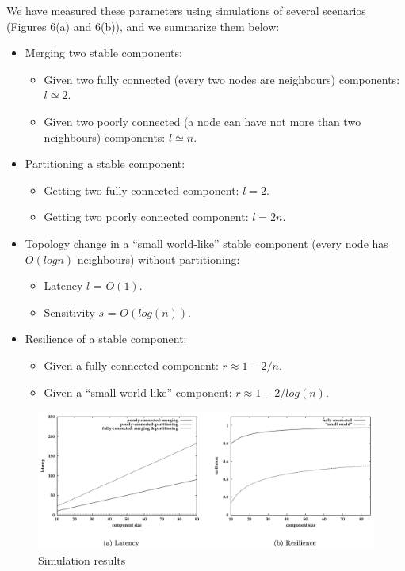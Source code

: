 We have measured these parameters using simulations of several scenarios (Figures 6(a) and 6(b)), and we summarize them below:

\begin{itemize}
	\item Merging two stable components:
	
	\begin{itemize}
		\item Given two fully connected (every two nodes are neighbours) components: $l \simeq 2$.
		\item Given two poorly connected (a node can have not more than two neighbours) components: $l \simeq n$.
	\end{itemize}
	
	\item Partitioning a stable component:
	
	\begin{itemize}
		\item Getting two fully connected component: $l = 2$.
		\item Getting two poorly connected component: $l = 2n$.
	\end{itemize}
	
	\item Topology change in a “small world-like” stable component (every node has $O(log n)$ neighbours) without partitioning:
	\begin{itemize}
		\item Latency $l$ = $O(1)$.
		\item Sensitivity $s$ = $O(log(n))$.
	\end{itemize}
	
	\item Resilience of a stable component:
	
	\begin{itemize}
		\item Given a fully connected component: $r \approx 1 - 2/n$.
		\item Given a “small world-like” component: $r \approx 1 - 2/log(n)$.
	\end{itemize}
	
\end{itemize}


\begin{figure}[hbtp]
	\centering
	\includegraphics[scale=.4]{performance_test.png}
	\caption{Simulation results}
\end{figure}

